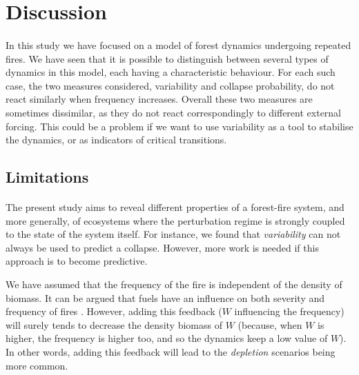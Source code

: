 \documentclass{article}
\begin{document}


\newpage
\section{Discussion}
\label{Discussion}

\paragraph{} %
In this study we have focused on a model of forest dynamics undergoing repeated fires. We have seen that it is possible to distinguish between several types of dynamics in this model, each having a characteristic behaviour. For each such case, the two measures considered, variability and collapse probability, do not react similarly when frequency increases. Overall these two measures are sometimes dissimilar, as they do not react correspondingly to different external forcing. This could be a problem if we want to use variability as a tool to stabilise the dynamics, or as indicators of critical transitions.

\subsection{Limitations}

\paragraph{}
The present study aims to reveal different properties of a forest-fire system, and more generally, of ecosystems where the perturbation regime is strongly coupled to the state of the system itself. For instance, we found that \textit{variability} can not always be used to predict a collapse. However, more work is needed if this approach is to become predictive.

\label{discussion_frequency_ass}
We have assumed that the frequency of the fire is independent of the density of biomass. It can be argued that fuels have an influence on both severity and frequency  of fires \citep{schoennagel_interaction_2004}. However, adding this feedback ($W$ influencing the frequency) will surely tends to decrease the density biomass of $W$ (because, when $W$ is higher, the frequency is higher too, and so the dynamics keep a low value of $W$). In other words, adding this feedback will lead to the \textit{depletion} scenarios being more common.
\end{document}
